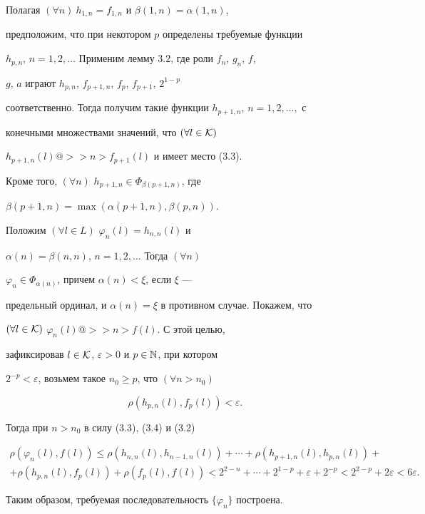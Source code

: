 \begin{pf}
 


Полагая $(\forall n)\ h_{1,n}=f_{1,n}$ и $\beta(1,n)=\alpha(1,n)$, 


предположим, что при некотором $p$ определены требуемые функции 


$h_{p,n}$, $n=1,2,\dotsc$ Применим лемму 3.2, где роли $f_n$, $g_n$, $f$, 


$g$, $a$ играют $h_{p,n}$, $f_{p+1,n}$, $f_p$, $f_{p+1}$, $2^{1-p}$ 


соответственно. Тогда получим такие функции $h_{p+1,n}$, $n=1,2,\dotsc,$ с 


конечными множествами значений, что $(\forall l\in\cal K)$ 


$h_{p+1,n}(l)@>>n>f_{p+1}(l)$ и имеет место (3.3). 


Кроме того, $(\forall n)$ $h_{p+1,n}\in \Phi_{\beta(p+1,n)}$, где 


$\beta(p+1,n)=\max(\alpha(p+1,n),\beta(p,n))$. 


 


Положим $(\forall l\in L)$ $\varphi_n(l)=h_{n,n}(l)$ и 


$\alpha(n)=\beta(n,n)$, $n=1,2,\dotsc$ Тогда $(\forall n)$ 


$\varphi_n\in \Phi_{\alpha(n)}$, причем $\alpha(n)<\xi$, если $\xi$ --- 


предельный ординал, и $\alpha(n)=\xi$ в противном случае. Покажем, что 


$(\forall l\in\cal K)$ $\varphi_n(l)@>>n>f(l)$. С этой целью, 


зафиксировав $l\in\cal K$, $\varepsilon>0$ и $p\in\Bbb N$, при котором 


$2^{-p}<\varepsilon$, возьмем такое $n_0\ge p$, что $(\forall n>n_0)$ 


\begin{equation} 


\rho(h_{p,n}(l),f_p(l))<\varepsilon. 


\end{equation} 


Тогда при $n>n_0$ в силу (3.3), (3.4) и (3.2) 


\begin{multline*} 


\rho(\varphi_n(l),f(l))\le \rho(h_{n,n}(l),h_{n-1,n}(l))+\dotsb+ 


\rho(h_{p+1,n}(l),h_{p,n}(l))+ \\ 


% 


+\rho(h_{p,n}(l),f_p(l))+\rho(f_p(l),f(l))<2^{2-n}+\dotsb+ 


2^{1-p}+\varepsilon+2^{-p}<2^{2-p}+2\varepsilon<6\varepsilon. 


\end{multline*} 


 


Таким образом, требуемая последовательность $\{\varphi_n\}$ построена. 


\end{pf}


